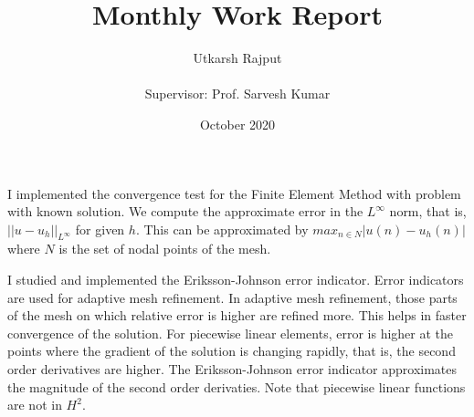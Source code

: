 \documentclass[12pt]{article}
\title{Monthly Work Report}
\date{October 2020}
\author{Utkarsh Rajput \\\\{Supervisor: Prof. Sarvesh Kumar}}
\begin{document}
	\maketitle
	I implemented the convergence test for the Finite Element Method with problem with known solution. We compute the approximate error in the $L^{\infty}$ norm, that is, $||u-u_h||_{L^{\infty}}$ for given $h$. This can be approximated by $max_{n\in N} |u(n)-u_h(n)|$ where $N$ is the set of nodal points of the mesh.
	
	I studied and implemented the Eriksson-Johnson error indicator. Error indicators are used for adaptive mesh refinement. In adaptive mesh refinement, those parts of the mesh on which relative error is higher are refined more. This helps in faster convergence of the solution. For piecewise linear elements, error is higher at the points where the gradient of the solution is changing rapidly, that is, the second order derivatives are higher. The Eriksson-Johnson error indicator approximates the magnitude of the second order derivaties. Note that piecewise linear functions are not in $H^2$.
\end{document}
